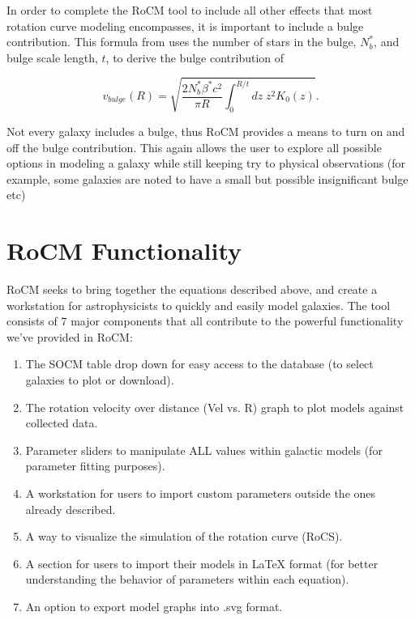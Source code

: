 \documentclass[conference]{IEEEtran-modified}
\begin{document}
In order to complete the RoCM tool to include all other effects that most rotation curve modeling encompasses, it is important to include a bulge contribution.  This formula from \cite{mannheim} uses the number of stars in the bulge, $N^*_b$, and bulge scale length, $t$, to derive the bulge contribution of

\begin{equation}
v_{bulge}(R) = \sqrt{\frac{2 N^*_b\beta^* c^2}{\pi R} \int_0^{R/t} dz\; z^2K_0(z)}.
\end{equation}

Not every galaxy includes a bulge, thus RoCM provides a means to turn on and off the bulge contribution.  This again allows the user to explore all possible options in modeling a galaxy while still keeping try to physical observations (for example, some galaxies are noted to have a small but possible insignificant bulge etc)


\section{RoCM Functionality}

RoCM seeks to bring together the equations described above, and create a workstation for astrophysicists to quickly and easily model galaxies. The tool consists of 7 major components that all contribute to the powerful functionality we've provided in RoCM:
\begin{enumerate}
       \item The SOCM table drop down for easy access to the database (to select galaxies to plot or download).
       \item The rotation velocity over distance (Vel vs. R) graph to plot models against collected data.
       \item Parameter sliders to manipulate ALL values within galactic models (for parameter fitting purposes).
       \item A workstation for users to import custom parameters outside the ones already described.
        \item A way to visualize the simulation of the rotation curve (RoCS).
       \item A section for users to import their models in LaTeX format (for better understanding the behavior of parameters within each equation). 
       \item An option to export model graphs into .svg format.

\end{enumerate}
\end{document}

